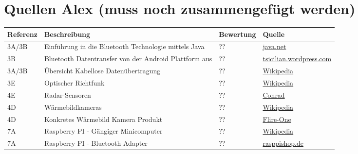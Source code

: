 \section{Quellen Alex (muss noch zusammengefügt werden)}

\begin{table}[h!]
	\centering
	\begin{tabular}{l l l l}
		Referenz & Beschreibung & Bewertung & Quelle \\
		\hline
        
        3A/3B & Einführung in die Bluetooth Technologie mittels Java & ?? & \href{https://today.java.net/pub/a/today/2004/07/27/bluetooth.html}{java.net} \\
        
        3B & Bluetooth Datentransfer von der Android Plattform aus & ?? & \href{http://tsicilian.wordpress.com/2012/11/06/bluetooth-data-transfer-with-android/}{tsicilian.wordpress.com} \\
        
        3A/3B & Übersicht Kabellose Datenübertragung & ?? & \href{http://de.wikipedia.org/w/index.php?title=Kabellose_\%C3\%9Cbertragungsverfahren&redirect=no}{Wikipedia} \\
        
        3E & Optischer Richtfunk & ?? & \href{http://de.wikipedia.org/wiki/Optischer_Richtfunk}{Wikipedia} \\
        
        4E & Radar-Sensoren & ?? & \href{http://www.conrad.ch/ce/de/overview/0231510/Radar-Sensoren}{Conrad} \\
        
        4D & Wärmebildkameras & ?? & \href{http://de.wikipedia.org/wiki/W\%C3\%A4rmebildkamera}{Wikipedia} \\
        
        4D & Konkretes Wärmebild Kamera Produkt & ?? & \href{http://www.mobilefun.co.uk/flir-one-personal-thermal-imaging-case-for-iphone-5-5s-p43472.htm}{Flire-One} \\
        
        7A & Raspberry PI - Gängiger Minicomputer & ?? & \href{http://de.wikipedia.org/wiki/Raspberry_Pi}{Wikipedia} \\
        
        7A & Raspberry PI - Bluetooth Adapter & ?? & \href{http://www.rasppishop.de/raspberry-pi-welt/netzwerk/w-lan/149/bluetooth-dongle-v2.0-adapter-fuer-raspberry-pi}{rasppishop.de} \\
        

\end{tabular}
\end{table}
